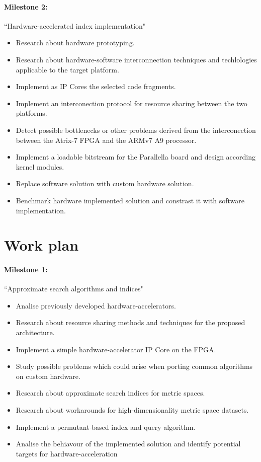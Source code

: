 \documentclass[11pt,letterpaper]{article}
\begin{document}
\paragraph{Milestone 2:} ``Hardware-accelerated index implementation"
\begin{itemize}
    \item Research about hardware prototyping.
    \item Research about hardware-software interconnection techniques and techlologies applicable to the
    target platform. 
    \item Implement as IP Cores the selected code fragments.
    \item Implement an interconection protocol for resource sharing between the two platforms.
    \item Detect possible bottlenecks or other problems derived from the interconection between the Atrix-7 
    FPGA and the ARMv7 A9 processor.
    \item Implement a loadable bitstream for the Parallella board and design according kernel modules.
    \item Replace software solution with custom hardware solution.
    \item Benchmark hardware implemented solution and constrast it with software implementation.
\end{itemize}

\section{Work plan}

\paragraph{Milestone 1:} ``Approximate search algorithms and indices"
\begin{itemize}
    \item Analise previously developed hardware-accelerators.
    \item Research about resource sharing methods and techniques for the proposed architecture.
    \item Implement a simple hardware-accelerator IP Core on the FPGA.
    \item Study possible problems which could arise when porting common algorithms on custom hardware.
    \item Research about approximate search indices for metric spaces.
    \item Research about workarounds for high-dimensionality metric space datasets.
    \item Implement a permutant-based index and query algorithm.
    \item Analise the behiavour of the implemented solution and identify potential targets for hardware-acceleration
\end{itemize}
\end{document}
